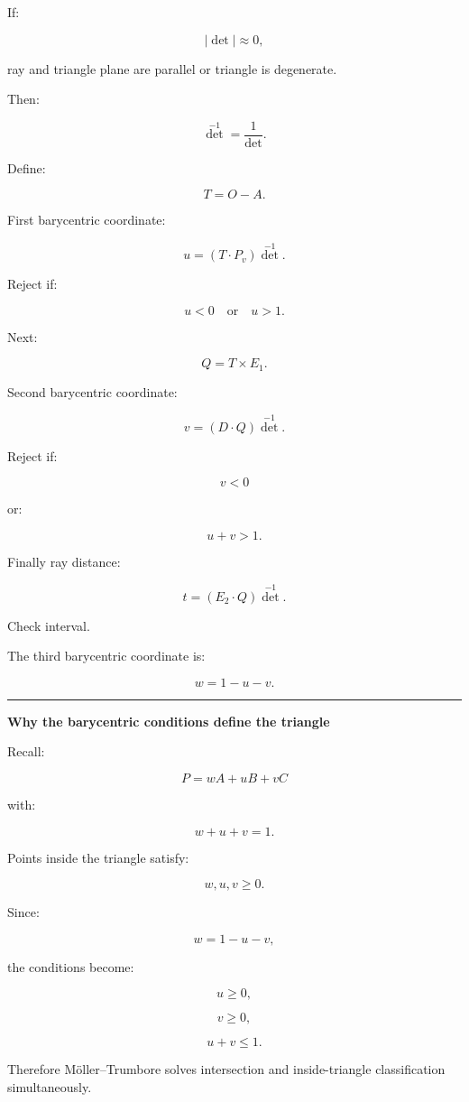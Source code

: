 If:

\[
|\det|\approx0,
\]

ray and triangle plane are parallel or triangle is degenerate.

Then:

\[
\det^{-1}=\frac1{\det}.
\]

Define:

\[
T=O-A.
\]

First barycentric coordinate:

\[
\boxed{
u=
(T\cdot P_v)\det^{-1}.
}
\]

Reject if:

\[
u<0
\quad\text{or}\quad
u>1.
\]

Next:

\[
Q=T\times E_1.
\]

Second barycentric coordinate:

\[
\boxed{
v=
(D\cdot Q)\det^{-1}.
}
\]

Reject if:

\[
v<0
\]

or:

\[
u+v>1.
\]

Finally ray distance:

\[
\boxed{
t=
(E_2\cdot Q)\det^{-1}.
}
\]

Check interval.

The third barycentric coordinate is:

\[
\boxed{
w=1-u-v.
}
\]

\begin{center}\rule{0.5\linewidth}{0.5pt}\end{center}

\textbf{Why the barycentric conditions define the triangle}

Recall:

\[
P=
wA+uB+vC
\]

with:

\[
w+u+v=1.
\]

Points inside the triangle satisfy:

\[
w,u,v\ge0.
\]

Since:

\[
w=1-u-v,
\]

the conditions become:

\[
u\ge0,
\]

\[
v\ge0,
\]

\[
u+v\le1.
\]

Therefore Möller--Trumbore solves intersection and inside-triangle classification simultaneously.

